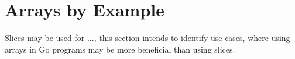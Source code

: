 \section{Arrays by Example}

Slices may be used for ..., this section intends to identify use cases, where
using arrays in Go programs may be more beneficial than using slices.



















